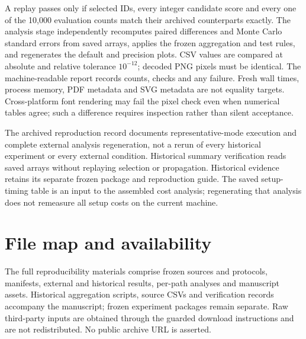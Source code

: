 \documentclass[smallextended]{svjour3}
\begin{document}
A replay passes only if selected IDs, every integer candidate score and every
one of the 10,000 evaluation counts match their archived counterparts exactly.
The analysis stage independently recomputes paired differences and Monte Carlo
standard errors from saved arrays, applies the frozen aggregation and test rules,
and regenerates the default and precision plots. CSV values are compared at
absolute and relative tolerance $10^{-12}$; decoded PNG pixels must be identical.
The machine-readable report records counts, checks and any failure. Fresh wall
times, process memory, PDF metadata and SVG metadata are not equality targets.
Cross-platform font rendering may fail the pixel check even when numerical
tables agree; such a difference requires inspection rather than silent acceptance.

The archived reproduction record documents representative-mode execution and
complete external analysis regeneration, not a rerun of every historical
experiment or every external condition. Historical summary verification reads
saved arrays without replaying selection or propagation.
Historical evidence retains its separate frozen package and reproduction guide.
The saved setup-timing table is an input to the assembled cost analysis; regenerating
that analysis does not remeasure all setup costs on the current machine.

\clearpage

\section{File map and availability}
The full reproducibility materials comprise frozen sources and protocols,
manifests, external and historical results, per-path analyses and manuscript
assets. Historical aggregation scripts, source CSVs and verification records
accompany the manuscript; frozen experiment packages remain separate. Raw
third-party inputs are obtained through the guarded download instructions and
are not redistributed. No public archive URL is asserted.
\end{document}

